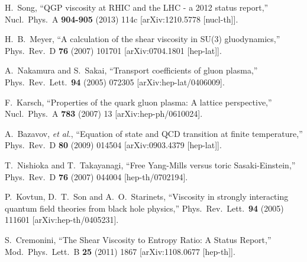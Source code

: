 \begin{thebibliography}{99}
  H.~Song,
  ``QGP viscosity at RHIC and the LHC - a 2012 status report,''
  Nucl.\ Phys.\ A {\bf 904-905} (2013) 114c
  [arXiv:1210.5778 [nucl-th]].
  

  H.~B.~Meyer,
  ``A calculation of the shear viscosity in SU(3) gluodynamics,''
  Phys.\ Rev.\  D {\bf 76} (2007) 101701
  [arXiv:0704.1801 [hep-lat]].

  A.~Nakamura and S.~Sakai,
  ``Transport coefficients of gluon plasma,''
  Phys.\ Rev.\ Lett.\  {\bf 94} (2005) 072305
  [arXiv:hep-lat/0406009].
  
  F.~Karsch,
  ``Properties of the quark gluon plasma: A lattice perspective,''
  Nucl.\ Phys.\  A {\bf 783} (2007) 13
  [arXiv:hep-ph/0610024].

  A.~Bazavov, 
  {\it et al.},
  ``Equation of state and QCD transition at finite temperature,''
  Phys.\ Rev.\ D {\bf 80} (2009) 014504
  [arXiv:0903.4379 [hep-lat]].

  T.~Nishioka and T.~Takayanagi,
  ``Free Yang-Mills versus toric Sasaki-Einstein,''
  Phys.\ Rev.\ D {\bf 76} (2007) 044004
  [hep-th/0702194].
  
  P.~Kovtun, D.~T.~Son and A.~O.~Starinets,
  ``Viscosity in strongly interacting quantum field theories from black hole
  physics,''
  Phys.\ Rev.\ Lett.\  {\bf 94} (2005) 111601
  [arXiv:hep-th/0405231].

  S.~Cremonini,
  ``The Shear Viscosity to Entropy Ratio: A Status Report,''
  Mod.\ Phys.\ Lett.\ B {\bf 25} (2011) 1867
  [arXiv:1108.0677 [hep-th]].


\end{thebibliography}
